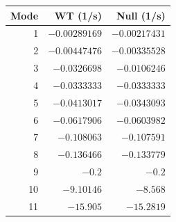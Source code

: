 \begin{tabular}{rrr}
\toprule
Mode & WT (1/s) & Null (1/s) \\
\midrule
1 & $-0.00289169$ & $-0.00217431$ \\
2 & $-0.00447476$ & $-0.00335528$ \\
3 & $-0.0326698$ & $-0.0106246$ \\
4 & $-0.0333333$ & $-0.0333333$ \\
5 & $-0.0413017$ & $-0.0343093$ \\
6 & $-0.0617906$ & $-0.0603982$ \\
7 & $-0.108063$ & $-0.107591$ \\
8 & $-0.136466$ & $-0.133779$ \\
9 & $-0.2$ & $-0.2$ \\
10 & $-9.10146$ & $-8.568$ \\
11 & $-15.905$ & $-15.2819$ \\
\bottomrule
\end{tabular}
